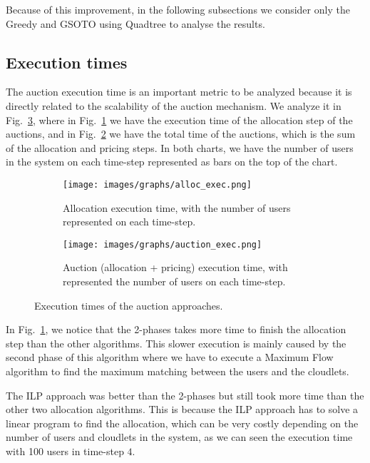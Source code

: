 \documentclass[English]{ic-tese-v3}
\begin{document}
Because of this improvement, in the following subsections we consider only the Greedy and GSOTO using Quadtree to analyse the results.

\subsection{Execution times}
The auction execution time is an important metric to be analyzed because it is directly related to the scalability of the auction mechanism. We analyze it in Fig.~\ref{fig:time}, where in Fig.~\ref{fig:alloc_exec} we have the execution time of the allocation step of the auctions, and in Fig.~\ref{fig:auction_exec} we have the total time of the auctions, which is the sum of the allocation and pricing steps. In both charts, we have the number of users in the system on each time-step represented as bars on the top of the chart.
\begin{figure}[H]
    \centering
    \begin{subfigure}{.45\textwidth}
        \centering
        \texttt{[image: images/graphs/alloc\_exec.png]}
        \caption{Allocation execution time, with the number of users represented  on each time-step.}
        \label{fig:alloc_exec}
    \end{subfigure}
    \begin{subfigure}{.45\textwidth}
        \centering
        \texttt{[image: images/graphs/auction\_exec.png]}
        \caption{Auction (allocation + pricing) execution time, with represented the number of users on each time-step.}
        \label{fig:auction_exec}
    \end{subfigure}
    \caption{Execution times of the auction approaches.}
    \label{fig:time}
\end{figure}
In Fig.~\ref{fig:alloc_exec}, we notice that the 2-phases takes more time to finish the allocation step than the other algorithms. This slower execution is mainly caused by the second phase of this algorithm where we have to execute a Maximum Flow algorithm to find the maximum matching between the users and the cloudlets.

The ILP approach was better than the 2-phases but still took more time than the other two allocation algorithms. This is because the ILP approach has to solve a linear program to find the allocation, which can be very costly depending on the number of users and cloudlets in the system, as we can seen the execution time with 100 users in time-step $4$.  
\end{document}

